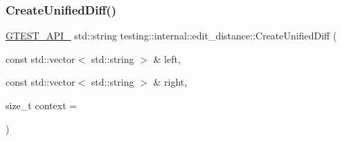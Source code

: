 \mbox{\label{namespacetesting_1_1internal_1_1edit__distance_a48cffebc6d3169ad1df7849b5f7fb5ff}} 
\subsubsection{\texorpdfstring{Create\+Unified\+Diff()}{CreateUnifiedDiff()}}
{\footnotesize\ttfamily \hyperlink{gtest-port_8h_aa73be6f0ba4a7456180a94904ce17790}{G\+T\+E\+S\+T\+\_\+\+A\+P\+I\+\_\+} std\+::string testing\+::internal\+::edit\+\_\+distance\+::\+Create\+Unified\+Diff (\begin{DoxyParamCaption}\item[{const std\+::vector$<$ std\+::string $>$ \&}]{left,  }\item[{const std\+::vector$<$ std\+::string $>$ \&}]{right,  }\item[{size\+\_\+t}]{context = {} }\end{DoxyParamCaption})}

